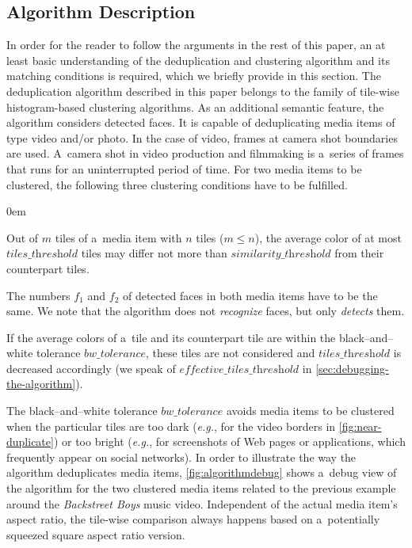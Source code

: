 \documentclass{article}
\begin{document}
\subsection{Algorithm Description}

In order for the reader to follow the arguments in the rest of this paper,
an at least basic understanding of the deduplication and clustering algorithm
and its matching conditions is required, which we briefly provide in this section.
The deduplication algorithm described in this paper
belongs to the family of tile-wise histogram-based clustering algorithms.
As an additional semantic feature, the algorithm considers detected faces.
It is capable of deduplicating media items of type video and/or photo.
In the case of video, frames at camera shot boundaries are used. %
A~camera shot in video production and filmmaking
is a~series of frames that runs for an uninterrupted period of time.
For two media items to be clustered,
the following three clustering conditions have to be fulfilled.

\begin{description}
  \itemsep0em 
  \item[Cond.~1] Out of $m$ tiles of a~media item with $n$ tiles ($m \leq n$),
    the average color of at most $\textit{tiles\_threshold}$ tiles may differ
    not more than $\textit{similarity\_threshold}$ from their counterpart tiles.
  \item[Cond.~2] The numbers $f_1$ and $f_2$ of detected faces in both media items
    have to be the same.
    We note that the algorithm does not \emph{recognize} faces,
    but only \emph{detects} them.
  \item[Cond.~3] If the average colors of a~tile and its counterpart tile
    are within the black--and--white tolerance $\textit{bw\_tolerance}$,
    these tiles are not considered and $\textit{tiles\_threshold}$
    is decreased accordingly (we speak of $\textit{effective\_tiles\_threshold}$
    in \autoref{sec:debugging-the-algorithm}).
\end{description}

The black--and--white tolerance $\textit{bw\_tolerance}$
avoids media items to be clustered when the particular tiles are too dark
(\emph{e.g.}, for the video borders in \autoref{fig:near-duplicate})
or too bright (\emph{e.g.}, for screenshots of Web pages or applications,
which frequently appear on social networks).
In order to illustrate the way the algorithm deduplicates media items,
\autoref{fig:algorithmdebug} shows a~debug view of the algorithm
for the two clustered media items related to the previous example around the
\emph{Backstreet Boys} music video.
Independent of the actual media item's aspect ratio,
the tile-wise comparison always happens based on a~potentially squeezed
square aspect ratio version.
\end{document}
